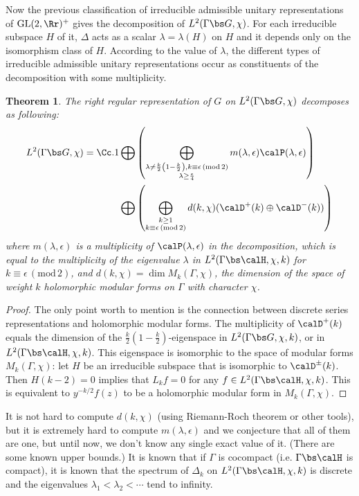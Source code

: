\documentclass{article}
\newtheorem{theorem}{Theorem}[section]
\newcommand{\GL}{\mathrm{GL}}
\newcommand{\Mod}[1]{\,(\mathrm{mod}\,#1)}
\begin{document}
Now the previous classification of irreducible admissible unitary representations of $\GL(2, \Rr)^{+}$ gives the decomposition of $L^{2}(\Gamma \bs G, \chi)$. 
For each irreducible subspace $H$ of it, $\Delta$ acts as a scalar $\lambda = \lambda(H)$ on $H$ and it depends only on the isomorphism class of $H$. According to the value of $\lambda$, the different types of irreducible admissible unitary representations occur as constituents of the decomposition with some multiplicity. 
\begin{theorem}
The right regular representation of $G$ on $L^{2}(\Gamma \bs G, \chi)$ decomposes as following:
\begin{align*}
L^{2}(\Gamma \bs G, \chi) = \Cc.1 &\bigoplus \left( \bigoplus_{\substack{\lambda \neq \frac{k}{2}\left(1-\frac{k}{2}\right), k\equiv \epsilon \Mod{2}\\ \lambda \geq \frac{\epsilon}{4}}} m(\lambda, \epsilon) \calP(\lambda, \epsilon)\right) \\&\bigoplus \left(\bigoplus_{\substack{k\geq 1 \\ k\equiv \epsilon \Mod{2}}}d(k, \chi) (\calD^{+}(k) \oplus \calD^{-}(k))\right)
\end{align*}
where $m(\lambda, \epsilon)$ is a multiplicity of $\calP(\lambda, \epsilon)$ in the decomposition, which is equal to the multiplicity of the eigenvalue $\lambda$ in $L^{2}(\Gamma\bs\calH, \chi, k)$ for $k\equiv \epsilon\Mod{2}$, and $d(k, \chi) = \dim M_{k}(\Gamma, \chi)$, the dimension of the space of weight $k$ holomorphic modular forms on $\Gamma$ with character $\chi$. 
\end{theorem}
\begin{proof}
The only point worth to mention is the connection between discrete series representations and holomorphic modular forms. The multiplicity of $\calD^{+}(k)$ equals the dimension of the $\frac{k}{2}\left( 1- \frac{k}{2}\right)$-eigenspace in $L^{2}(\Gamma\bs G, \chi, k)$, or in $L^{2}(\Gamma \bs \calH, \chi, k)$. This eigenspace is isomorphic to the space of modular forms $M_{k}(\Gamma, \chi)$: let $H$ be an irreducible subspace that is isomorphic to $\calD^{\pm}(k)$. 
Then $H(k-2) = 0$ implies that $L_{k}f = 0$ for any $f\in L^{2}(\Gamma \bs \calH, \chi, k)$. This is equivalent to $y^{-k/2}f(z)$ to be a holomorphic modular form in $M_{k}(\Gamma, \chi)$. 
\end{proof}
It is not hard to compute $d(k, \chi)$ (using Riemann-Roch theorem or other tools), but it is extremely hard to compute $m(\lambda, \epsilon)$ and we conjecture that all of them are one, but until now, we don't know any single exact value of it. (There are some known upper bounds.) 
It is known that  if $\Gamma$ is cocompact (i.e. $\Gamma \bs \calH$ is compact), it is known that the spectrum of $\Delta_k$ on $L^{2}(\Gamma\bs\calH, \chi, k)$ is discrete and the eigenvalues $ \lambda_1 < \lambda_2 < \cdots$ tend to infinity. 
\end{document}
